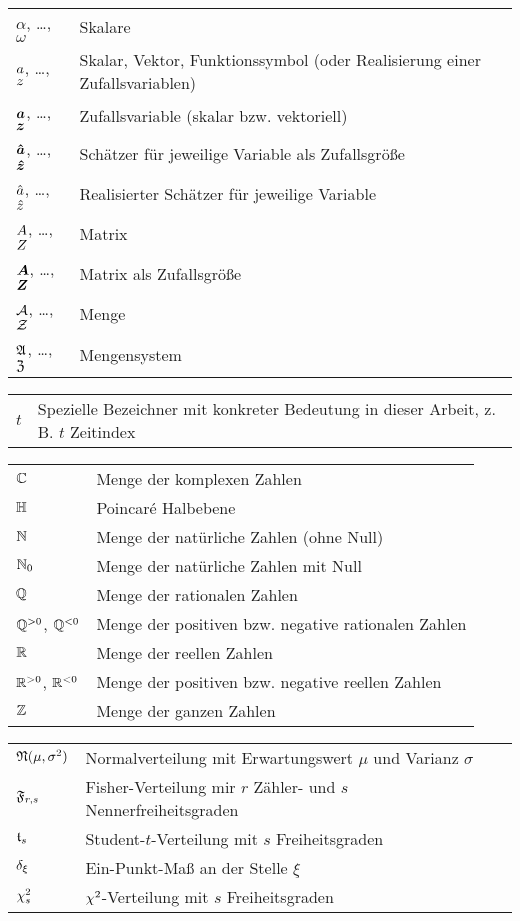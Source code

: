 

\begin{tabular}{p{1.5cm} p{12cm}}
$\alpha$, \dots, $\omega$ & Skalare \\
$a$, \dots, $z$ & Skalar, Vektor, Funktionssymbol (oder Realisierung einer Zufallsvariablen) \\
$\boldsymbol{a}$, \dots, $\boldsymbol{z}$ & Zufallsvariable (skalar bzw. vektoriell) \\
$\boldsymbol{\hat{a}}$, \dots, $\boldsymbol{\hat{z}}$ & Schätzer für jeweilige Variable als Zufallsgröße \\
$\hat{a}$, \dots, $\hat{z}$ & Realisierter Schätzer für jeweilige Variable \\
$A$, \dots, $Z$ & Matrix \\
$\boldsymbol{A}$, \dots, $\boldsymbol{Z}$ & Matrix als Zufallsgröße\\
$\mathcal{A}$, \dots, $\mathcal{Z}$ & Menge \\
$\mathfrak{A}$, \dots, $\mathfrak{Z}$ & Mengensystem \\
\end{tabular}


\begin{tabular}{p{1.5cm} p{12cm}}
$t$ & Spezielle Bezeichner mit konkreter Bedeutung in dieser Arbeit, z.\,B. $t$ Zeitindex\\
\end{tabular}


\begin{tabular}{p{1.5cm} p{12cm}}
$\mathbb{C}$ & Menge der komplexen Zahlen \\
$\mathbb{H}$ & Poincaré Halbebene\\
$\mathbb{N}$ & Menge der natürliche Zahlen (ohne Null) \\
$\mathbb{N}_0$ & Menge der natürliche Zahlen mit Null \\
$\mathbb{Q}$ & Menge der rationalen Zahlen \\
$\mathbb{Q}^{>0}$, $\mathbb{Q}^{<0}$ & Menge der positiven bzw. negative rationalen Zahlen \\
$\mathbb{R}$ & Menge der reellen Zahlen \\
$\mathbb{R}^{>0}$, $\mathbb{R}^{<0}$ & Menge der positiven bzw. negative reellen Zahlen \\
$\mathbb{Z}$ & Menge der ganzen Zahlen \\
\end{tabular}


\begin{tabular}{p{1.5cm} p{12cm}}
$\mathfrak{N}( \mu, \sigma^2 )$ & Normalverteilung mit Erwartungswert $\mu$ und Varianz $\sigma$ \\
$\mathfrak{F}_{r,s}$ & Fisher-Verteilung mir $r$ Zähler- und $s$ Nennerfreiheitsgraden\\
$\mathfrak{t}_s$ & Student-$t$-Verteilung mit $s$ Freiheitsgraden \\
$\delta_\xi$ & Ein-Punkt-Maß an der Stelle $\xi$ \\
$\chi^2_s$ & $\chi^2$-Verteilung mit $s$ Freiheitsgraden \\
\end{tabular}
